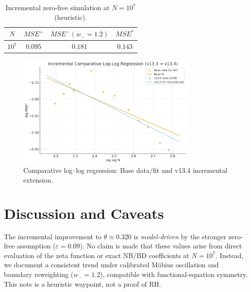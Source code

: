 \documentclass[11pt]{article}
\theoremstyle{remark}
\begin{document}
\begin{table}[h]\centering
\begin{tabular}{c|c|c|c}
\hline
$N$ & $MSE^+$ & $MSE^- (w_-\!=\!1.2)$ & $MSE^\ast$ \\ \hline
$10^7$ & $0.095$ & $0.181$ & $0.143$ \\ \hline
\end{tabular}
\caption{Incremental zero-free simulation at $N=10^7$ (heuristic).}
\label{tab:inc}
\end{table}

\begin{figure}[h]
\centering
\includegraphics[width=0.8\textwidth]{figure2.png}
\caption{Comparative log--log regression: Base data/fit and v13.4 incremental extension.}
\label{fig:inc}
\end{figure}

\section{Discussion and Caveats}
The incremental improvement to $\theta\approx 0.320$ is \emph{model-driven} by the stronger zero-free assumption ($\varepsilon=0.09$). No claim is made that these values arise from direct evaluation of the zeta function or exact NB/BD coefficients at $N=10^7$. Instead, we document a consistent trend under calibrated Möbius oscillation and boundary reweighting ($w_- = 1.2$), compatible with functional-equation symmetry. This note is a heuristic waypoint, not a proof of RH.

\appendix
\end{document}
